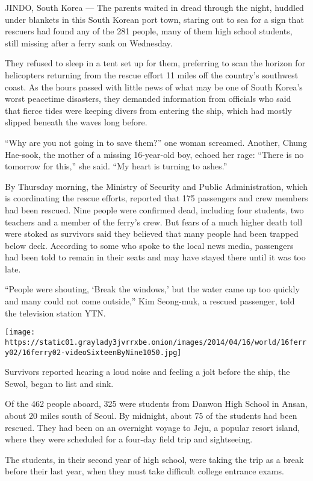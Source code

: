JINDO, South Korea --- The parents waited in dread through the night,
huddled under blankets in this South Korean port town, staring out to
sea for a sign that rescuers had found any of the 281 people, many of
them high school students, still missing after a ferry sank on
Wednesday.

They refused to sleep in a tent set up for them, preferring to scan the
horizon for helicopters returning from the rescue effort 11 miles off
the country's southwest coast. As the hours passed with little news of
what may be one of South Korea's worst peacetime disasters, they
demanded information from officials who said that fierce tides were
keeping divers from entering the ship, which had mostly slipped beneath
the waves long before.

``Why are you not going in to save them?'' one woman screamed. Another,
Chung Hae-sook, the mother of a missing 16-year-old boy, echoed her
rage: ``There is no tomorrow for this,'' she said. ``My heart is turning
to ashes.''

By Thursday morning, the Ministry of Security and Public Administration,
which is coordinating the rescue efforts, reported that 175 passengers
and crew members had been rescued. Nine people were confirmed dead,
including four students, two teachers and a member of the ferry's crew.
But fears of a much higher death toll were stoked as survivors said they
believed that many people had been trapped below deck. According to some
who spoke to the local news media, passengers had been told to remain in
their seats and may have stayed there until it was too late.

``People were shouting, `Break the windows,' but the water came up too
quickly and many could not come outside,'' Kim Seong-muk, a rescued
passenger, told the television station YTN.

\texttt{[image: https://static01.graylady3jvrrxbe.onion/images/2014/04/16/world/16ferry02/16ferry02-videoSixteenByNine1050.jpg]}

Survivors reported hearing a loud noise and feeling a jolt before the
ship, the Sewol, began to list and sink.

Of the 462 people aboard, 325 were students from Danwon High School in
Ansan, about 20 miles south of Seoul. By midnight, about 75 of the
students had been rescued. They had been on an overnight voyage to Jeju,
a popular resort island, where they were scheduled for a four-day field
trip and sightseeing.

The students, in their second year of high school, were taking the trip
as a break before their last year, when they must take difficult college
entrance exams.

